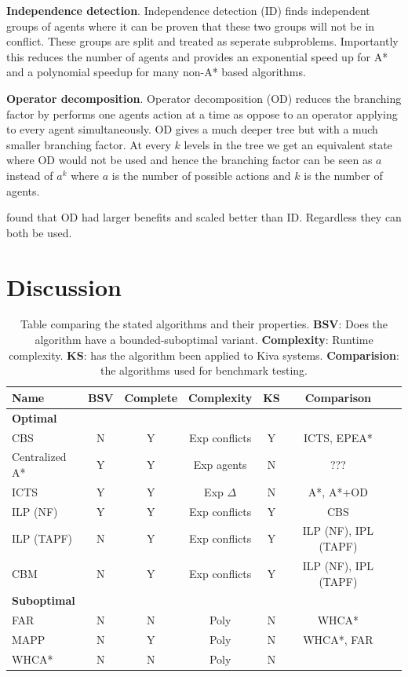 \documentclass[a4paper,11pt]{article}
\begin{document}
\textbf{Independence detection}. Independence detection (ID) finds independent groups of agents where it can be proven that these two groups will not be in conflict. These groups are split and treated as seperate subproblems. Importantly this reduces the number of agents and provides an exponential speed up for A* and a polynomial speedup for many non-A* based algorithms.

\textbf{Operator decomposition}. Operator decomposition (OD) reduces the branching factor by performs one agents action at a time as oppose to an operator applying to every agent simultaneously. OD gives a much deeper tree but with a much smaller branching factor. At every $k$ levels in the tree we get an equivalent state where OD would not be used and hence the branching factor can be seen as $a$ instead of $a^k$ where $a$ is the number of possible actions and $k$ is the number of agents.

\cite{standley2010finding} found that OD had larger benefits and scaled better than ID. Regardless they can both be used.

\section{Discussion} \label{sec:discussion}

\begin{table}
	\centering
	\small
	\begin{tabular}{ l c c c c c p{2.3cm}}
		
		\textbf{Name} & \textbf{BSV} & \textbf{Complete} & \textbf{Complexity} & \textbf{KS} & \textbf{Comparison} \\
		\hline
		\multicolumn{6}{l}{\textbf{Optimal}} \\
		\hline
		CBS 				& N & Y & Exp conflicts & Y & ICTS, EPEA* \\
		Centralized A* 		& Y & Y & Exp agents & N & ??? \\
		ICTS 				& Y & Y & Exp $\Delta$ & N & A*, A*+OD \\
		ILP	(NF)			& Y & Y & Exp conflicts & Y & CBS \\
		ILP	(TAPF)			& N & Y & Exp conflicts & Y & ILP (NF), IPL (TAPF) \\
		CBM 				& N & Y & Exp conflicts & Y & ILP (NF), IPL (TAPF) \\
		\hline
		\multicolumn{6}{l}{\textbf{Suboptimal}} \\
		\hline
		FAR  				& N & N & Poly & N & WHCA* \\
		MAPP 				& N & Y & Poly & N & WHCA*, FAR \\
		WHCA* 				& N & N & Poly & N & \\
	\end{tabular}

	\caption{Table comparing the stated algorithms and their properties. \textbf{BSV}: Does the algorithm have a bounded-suboptimal variant. \textbf{Complexity}: Runtime complexity. \textbf{KS}: has the algorithm been applied to Kiva systems. \textbf{Comparision}: the algorithms used for benchmark testing.}
	\label{table:comparison}
\end{table}
\end{document}
